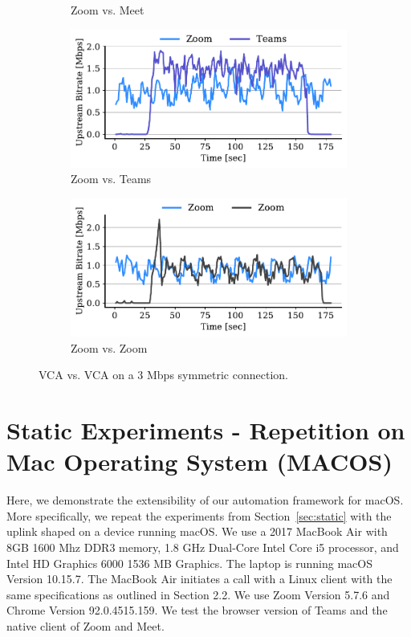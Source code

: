 \begin{figure}[]
\begin{subfigure}[t]{.4\textwidth}
    \caption{Zoom vs. Meet}
    \label{subfig:zoom-meet-3}
\end{subfigure}
\begin{subfigure}[t]{.4\textwidth}
    \centering
    \includegraphics[width=1\textwidth]{figures/appendix/zoom_teams_3_ul_r2.pdf}
    \caption{Zoom vs. Teams}
    \label{subfig:zoom-teams-3}
\end{subfigure}
\begin{subfigure}[t]{.4\textwidth}
    \centering
    \includegraphics[width=1\textwidth]{figures/appendix/zoom_zoom_3_ul_r1.pdf}
    \caption{Zoom vs. Zoom}
    \label{subfig:zoom-zoom-3}
\end{subfigure}
\caption{VCA vs. VCA on a 3 Mbps symmetric connection.}
\label{fig:vca-vca-3}
\end{figure}

\section{Static Experiments - Repetition on Mac Operating System (MACOS)}
\label{appendix:static}
Here, we demonstrate the extensibility of our automation framework for macOS. More specifically, we repeat the experiments from Section~\ref{sec:static} with the uplink shaped on a device running macOS. We use a 2017 MacBook Air with 8GB 1600 Mhz DDR3 memory, 1.8 GHz Dual-Core Intel Core i5 processor, and Intel HD Graphics 6000 1536 MB Graphics. The laptop is running macOS Version 10.15.7. The MacBook Air initiates a call with a Linux client with the same specifications as outlined in Section 2.2. We use Zoom Version 5.7.6 and Chrome Version 92.0.4515.159. We test the
browser version of Teams and the native client of Zoom and Meet. 

